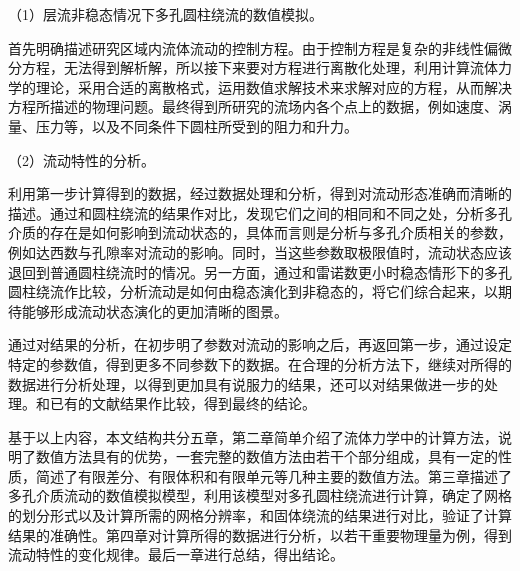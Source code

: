 （1）层流非稳态情况下多孔圆柱绕流的数值模拟。

首先明确描述研究区域内流体流动的控制方程。由于控制方程是复杂的非线性偏微分方程，无法得到解析解，所以接下来要对方程进行离散化处理，利用计算流体力学的理论，采用合适的离散格式，运用数值求解技术来求解对应的方程，从而解决方程所描述的物理问题。最终得到所研究的流场内各个点上的数据，例如速度、涡量、压力等，以及不同条件下圆柱所受到的阻力和升力。

（2）流动特性的分析。

利用第一步计算得到的数据，经过数据处理和分析，得到对流动形态准确而清晰的描述。通过和圆柱绕流的结果作对比，发现它们之间的相同和不同之处，分析多孔介质的存在是如何影响到流动状态的，具体而言则是分析与多孔介质相关的参数，例如达西数与孔隙率对流动的影响。同时，当这些参数取极限值时，流动状态应该退回到普通圆柱绕流时的情况。另一方面，通过和雷诺数更小时稳态情形下的多孔圆柱绕流作比较，分析流动是如何由稳态演化到非稳态的，将它们综合起来，以期待能够形成流动状态演化的更加清晰的图景。

通过对结果的分析，在初步明了参数对流动的影响之后，再返回第一步，通过设定特定的参数值，得到更多不同参数下的数据。在合理的分析方法下，继续对所得的数据进行分析处理，以得到更加具有说服力的结果，还可以对结果做进一步的处理。和已有的文献结果作比较，得到最终的结论。

基于以上内容，本文结构共分五章，第二章简单介绍了流体力学中的计算方法，说明了数值方法具有的优势，一套完整的数值方法由若干个部分组成，具有一定的性质，简述了有限差分、有限体积和有限单元等几种主要的数值方法。第三章描述了多孔介质流动的数值模拟模型，利用该模型对多孔圆柱绕流进行计算，确定了网格的划分形式以及计算所需的网格分辨率，和固体绕流的结果进行对比，验证了计算结果的准确性。第四章对计算所得的数据进行分析，以若干重要物理量为例，得到流动特性的变化规律。最后一章进行总结，得出结论。
